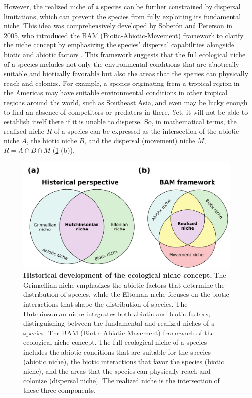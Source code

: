 However, the realized niche of a species can be further constrained by
dispersal limitations, which can prevent the species from fully exploiting
its fundamental niche. This idea was comprehensively developed by Soberón and
Peterson in 2005, who introduced the BAM (Biotic-Abiotic-Movement) framework
to clarify the niche concept by emphasizing the species' dispersal capabilities
alongside biotic and abiotic factors \cite{Soberon2005}. This framework
suggests that the full ecological niche of a species includes not only the
environmental conditions that are abiotically suitable and biotically
favorable but also the areas that the species can physically reach and
colonize. For example, a species originating from a tropical region in the
Americas may have suitable environmental conditions in other tropical regions
around the world, such as Southeast Asia, and even may be lucky enough to find
an absence of competitors or predators in there. Yet, it will not be able to
establish itself there if it is unable to disperse. So, in mathematical terms,
the realized niche $R$ of a species can be expressed as the intersection of the
abiotic niche $A$, the biotic niche $B$, and the dispersal (movement) niche
$M$, $R=A\cap B\cap M$ (\cref{fig:niche_concept} (b)).

\begin{figure}[H]
  \centering
  \includegraphics[width=1\textwidth]{Figures/Niche_theory.pdf}
  \caption[Historical development of the ecological niche concept]{
    \textbf{Historical development of the ecological niche concept.} The
    Grinnellian niche emphasizes the abiotic factors that determine the
    distribution of species, while the Eltonian niche focuses on the biotic
    interactions that shape the distribution of species. The Hutchinsonian
    niche integrates both abiotic and biotic factors, distinguishing
    between the fundamental and realized niches of a species. The BAM
    (Biotic-Abiotic-Movement) framework of the ecological niche concept. The
    full ecological niche of a species includes the abiotic conditions that
    are
    suitable for the species (abiotic niche), the biotic interactions that
    favor the species (biotic niche), and the areas that the species can
    physically reach and colonize (dispersal niche). The realized niche is
    the
    intersection of these three components.}
  \label{fig:niche_concept}
\end{figure}

